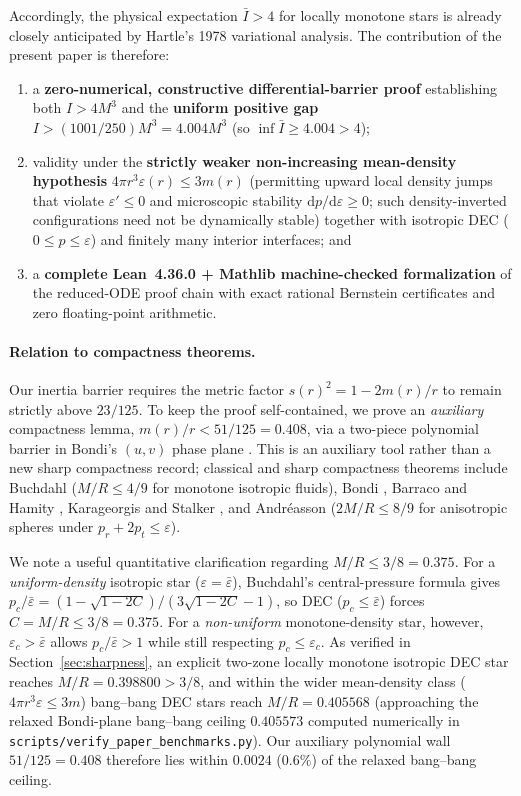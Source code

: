 \documentclass[11pt]{article}
\theoremstyle{plain}
\theoremstyle{definition}
\newcommand{\dd}{\mathrm{d}}
\newcommand{\eps}{\varepsilon}
\newcommand{\Ibar}{\bar{I}}
\begin{document}
Accordingly, the physical expectation $\Ibar > 4$ for locally monotone stars is already closely anticipated by Hartle's 1978 variational analysis. The contribution of the present paper is therefore:
\begin{enumerate}
  \item a \textbf{zero-numerical, constructive differential-barrier proof} establishing both $I > 4 M^3$ and the \textbf{uniform positive gap} $I > (1001/250) M^3 = 4.004 M^3$ (so $\inf \Ibar \ge 4.004 > 4$);
  \item validity under the \textbf{strictly weaker non-increasing mean-density hypothesis} $4\pi r^3 \eps(r) \le 3 m(r)$ (permitting upward local density jumps that violate $\eps' \le 0$ and microscopic stability $\dd p/\dd\eps \ge 0$; such density-inverted configurations need not be dynamically stable) together with isotropic DEC ($0 \le p \le \eps$) and finitely many interior interfaces; and
  \item a \textbf{complete Lean~4.36.0 + Mathlib machine-checked formalization} of the reduced-ODE proof chain with exact rational Bernstein certificates and zero floating-point arithmetic.
\end{enumerate}

\paragraph{Relation to compactness theorems.}
Our inertia barrier requires the metric factor $s(r)^2 = 1 - 2 m(r)/r$ to remain strictly above $23/125$. To keep the proof self-contained, we prove an \emph{auxiliary} compactness lemma, $m(r)/r < 51/125 = 0.408$, via a two-piece polynomial barrier in Bondi's $(u,v)$ phase plane \cite{Bondi1964}. This is an auxiliary tool rather than a new sharp compactness record; classical and sharp compactness theorems include Buchdahl \cite{Buchdahl1959} ($M/R \le 4/9$ for monotone isotropic fluids), Bondi \cite{Bondi1964}, Barraco and Hamity \cite{BarracoHamity2002}, Karageorgis and Stalker \cite{KarageorgisStalker2008}, and Andr\'easson \cite{Andreasson2008} ($2M/R \le 8/9$ for anisotropic spheres under $p_r + 2 p_t \le \eps$).

We note a useful quantitative clarification regarding $M/R \le 3/8 = 0.375$. For a \emph{uniform-density} isotropic star ($\eps = \bar{\eps}$), Buchdahl's central-pressure formula gives $p_c/\bar{\eps} = (1-\sqrt{1-2C})/(3\sqrt{1-2C}-1)$, so DEC ($p_c \le \bar{\eps}$) forces $C = M/R \le 3/8 = 0.375$. For a \emph{non-uniform} monotone-density star, however, $\eps_c > \bar{\eps}$ allows $p_c/\bar{\eps} > 1$ while still respecting $p_c \le \eps_c$. As verified in Section~\ref{sec:sharpness}, an explicit two-zone locally monotone isotropic DEC star reaches $M/R = 0.398800 > 3/8$, and within the wider mean-density class ($4\pi r^3 \eps \le 3 m$) bang--bang DEC stars reach $M/R = 0.405568$ (approaching the relaxed Bondi-plane bang--bang ceiling $0.405573$ computed numerically in \texttt{scripts/verify\_paper\_benchmarks.py}). Our auxiliary polynomial wall $51/125 = 0.408$ therefore lies within $0.0024$ ($0.6\%$) of the relaxed bang--bang ceiling.
\end{document}
